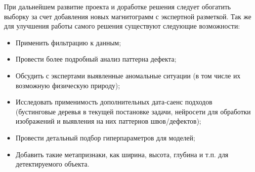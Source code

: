 \documentclass[a4paper,article,14pt]{extarticle}
\begin{document}
При дальнейшем развитие проекта и доработке решения следует обогатить выборку за счет добавления новых магнитограмм 
с экспертной разметкой. Так же для улучшения работы самого решения существуют следующие возможности:

\begin{itemize}
    \item Применить фильтрацию к данным;
    \item Провести более подробный анализ паттерна дефекта;
    \item Обсудить с экспертами выявленные аномальные ситуации (в том числе их возможную физическую природу);
    \item Исследовать применимость дополнительных дата-саенс подходов (бустинговые деревья в текущей постановке задачи, нейросети для обработки изображений и выявления на них паттернов швов/дефектов);
    \item Провести детальный подбор гиперпараметров для моделей;
    \item Добавить такие метапризнаки, как ширина, высота, глубина и т.п. для детектируемого объекта.
\end{itemize}
\pagebreak
\end{document}
